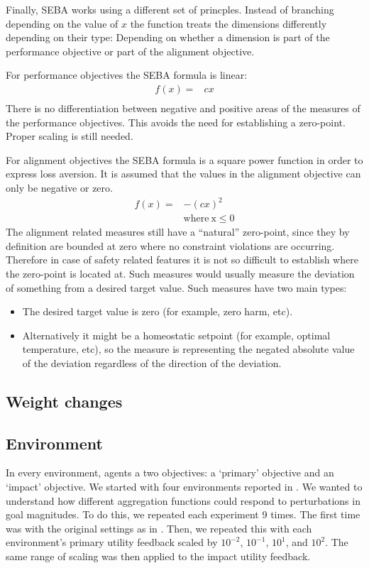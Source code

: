 Finally, SEBA works using a different set of princples. Instead of branching depending on the value of $x$ the function treats the dimensions differently depending on their type: Depending on whether a dimension is part of the performance objective or part of the alignment objective.

For performance objectives the SEBA formula is linear:
\begin{align}
f(x)= &  cx \\ \nonumber
\end{align}
There is no differentiation between negative and positive areas of the measures of the performance objectives. This avoids the need for establishing a zero-point. Proper scaling is still needed.

For alignment objectives the SEBA formula is a square power function in order to express loss aversion. It is assumed that the values in the alignment objective can only be negative or zero.
\begin{align}
f(x)= &  -(cx)^2 \\ \nonumber
  &  \mathrm{ where \: x \leq 0}
\end{align}
The alignment related measures still have a “natural” zero-point, since they by definition are bounded at zero where no constraint violations are occurring. Therefore in case of safety related features it is not so difficult to establish where the zero-point is located at. Such measures would usually measure the deviation of something from a desired target value. Such measures have two main types:
\begin{itemize}
    \item The desired target value is zero (for example, zero harm, etc).
    \item Alternatively it might be a homeostatic setpoint (for example, optimal temperature, etc), so the measure is representing the negated absolute value of the deviation regardless of the direction of the deviation.
\end{itemize}

\subsection{Weight changes}

\subsection{Environment}

In every environment, agents a two objectives: a `primary' objective and an `impact' objective. We started with four environments reported in \cite{vamplew_potential-based_2021}. We wanted to understand how different aggregation functions could respond to perturbations in goal magnitudes. To do this, we repeated each experiment 9 times. The first time was with the original settings as in \cite{vamplew_potential-based_2021}. Then, we repeated this with each environment's primary utility feedback scaled by $10^{-2}$, $10^{-1}$, $10^1$, and $10^2$. The same range of scaling was then applied to the impact utility feedback.

